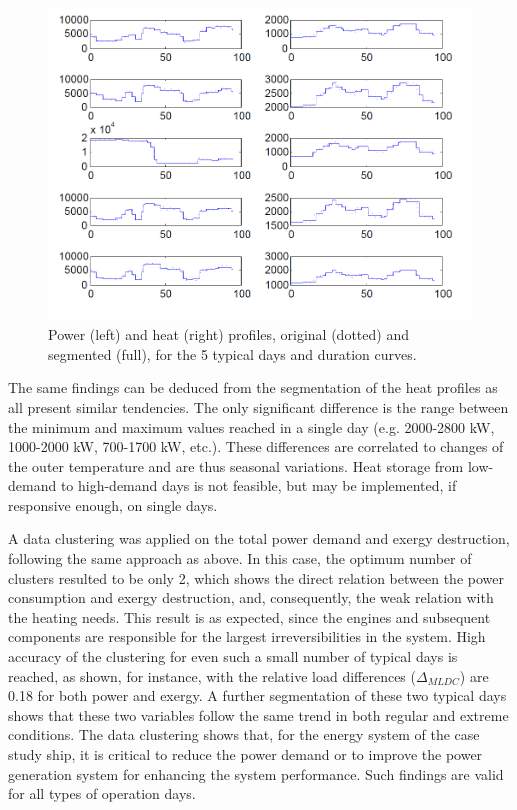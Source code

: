 \documentclass[preprint,12pt]{elsarticle}
\begin{document}
\begin{figure}[htbp!]
	\centering
	\includegraphics[width=0.95\linewidth]{Figures/segmentation_power_heat.png}
	\caption{Power (left) and heat (right) profiles, original (dotted) and segmented (full), for the 5 typical days and duration curves.}
	\label{fig:res:powerProfileSegmented}
\end{figure}
 
 

The same findings can be deduced from the segmentation of the heat profiles as all present similar tendencies. The only significant difference is the range between the minimum and maximum values reached in a single day (e.g. 2000-2800 kW, 1000-2000 kW, 700-1700 kW, etc.). These differences are correlated to changes of the outer temperature and are thus seasonal variations. Heat storage from low-demand to high-demand days is not feasible, but may be implemented, if responsive enough, on single days.   

A data clustering was applied on the total power demand and exergy destruction, following the same approach as above. In this case, the optimum number of clusters resulted to be only 2, which shows the direct relation between the power consumption and exergy destruction, and, consequently, the weak relation with the heating needs. This result is as expected, since the engines and subsequent components are responsible for the largest irreversibilities in the system. High accuracy of the clustering for even such a small number of typical days is reached, as shown, for instance, with the relative load differences ($\Delta_{MLDC}$) are 0.18 for both power and exergy. A further segmentation of these two typical days shows that these two variables follow the same trend in both regular and extreme conditions. The data clustering shows that, for the energy system of the case study ship, it is critical to reduce the power demand or to improve the power generation system for enhancing the system performance. Such findings are valid for all types of operation days.  
\end{document}
